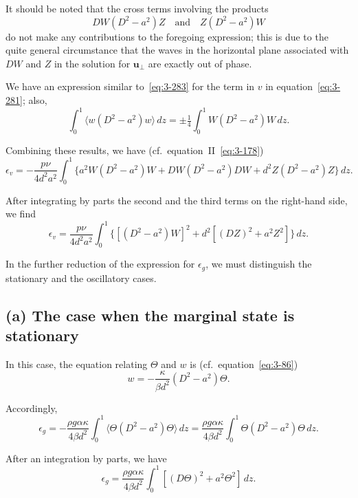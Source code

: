 It should be noted that the cross terms involving the products
\[
DW(D^2-a^2)Z \quad \text{and} \quad Z(D^2-a^2)W
\]
do not make any contributions to the foregoing expression; this is due to the quite general circumstance that the waves in the horizontal plane associated with $DW$ and $Z$ in the solution for $\mathbf{u}_\perp$ are exactly out of phase.

We have an expression similar to~\eqref{eq:3-283} for the term in $v$ in equation~\eqref{eq:3-281}; also,
\begin{equation}\label{eq:3-284}
\int_0^1 \langle w(D^2 - a^2)w\rangle\,dz = \pm\tfrac{1}{4}\int_0^1 W(D^2 - a^2)W\,dz.
\end{equation}

Combining these results, we have (cf.\ equation~II~\eqref{eq:3-178})
\begin{equation}\label{eq:3-285}
\epsilon_v = -\frac{p\nu}{4d^2 a^2}\int_0^1 \{a^2 W(D^2 - a^2)W + DW(D^2 - a^2)DW + d^2 Z(D^2 - a^2)Z\}\,dz.
\end{equation}

After integrating by parts the second and the third terms on the right-hand side, we find
\begin{equation}\label{eq:3-286}
\epsilon_v = \frac{p\nu}{4d^2 a^2}\int_0^1 \{[(D^2 - a^2)W]^2 + d^2 [(DZ)^2 + a^2 Z^2]\}\,dz.
\end{equation}

In the further reduction of the expression for $\epsilon_g$, we must distinguish the stationary and the oscillatory cases.

\subsection*{(a) The case when the marginal state is stationary}

In this case, the equation relating $\Theta$ and $w$ is (cf.\ equation~\eqref{eq:3-86})
\begin{equation}\label{eq:3-287}
w = -\frac{\kappa}{\beta d^2}(D^2 - a^2)\Theta.
\end{equation}

Accordingly,
\begin{equation}\label{eq:3-288}
\epsilon_g = -\frac{\rho g\alpha\kappa}{4\beta d^2}\int_0^1 \langle \Theta(D^2 - a^2)\Theta\rangle\,dz = \frac{\rho g\alpha\kappa}{4\beta d^2}\int_0^1 \Theta(D^2 - a^2)\Theta\,dz.
\end{equation}

After an integration by parts, we have
\begin{equation}\label{eq:3-289}
\epsilon_g = \frac{\rho g\alpha\kappa}{4\beta d^2}\int_0^1 [(D\Theta)^2 + a^2\Theta^2]\,dz.
\end{equation}

